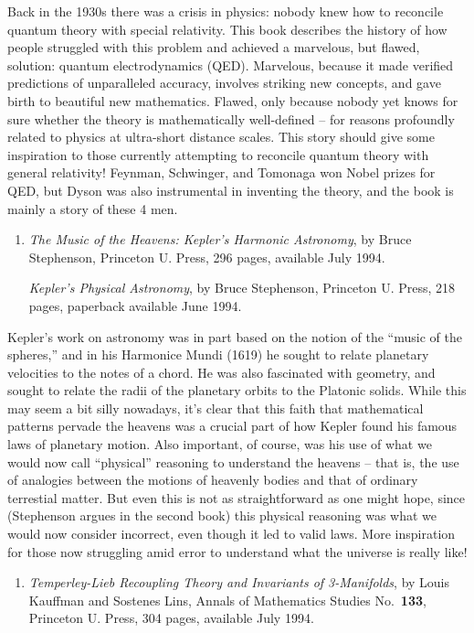 \documentclass{article}
\def\tightlist{}
\begin{document}
Back in the 1930s there was a crisis in physics: nobody knew how to
reconcile quantum theory with special relativity. This book describes
the history of how people struggled with this problem and achieved a
marvelous, but flawed, solution: quantum electrodynamics (QED).
Marvelous, because it made verified predictions of unparalleled
accuracy, involves striking new concepts, and gave birth to beautiful
new mathematics. Flawed, only because nobody yet knows for sure whether
the theory is mathematically well-defined -- for reasons profoundly
related to physics at ultra-short distance scales. This story should
give some inspiration to those currently attempting to reconcile quantum
theory with general relativity! Feynman, Schwinger, and Tomonaga won
Nobel prizes for QED, but Dyson was also instrumental in inventing the
theory, and the book is mainly a story of these 4 men.

\begin{enumerate}
\def\labelenumi{\arabic{enumi})}
\setcounter{enumi}{1}
\item
  \emph{The Music of the Heavens: Kepler's Harmonic Astronomy}, by Bruce
  Stephenson, Princeton U. Press, 296 pages, available July 1994.

  \emph{Kepler's Physical Astronomy}, by Bruce Stephenson, Princeton U.
  Press, 218 pages, paperback available June 1994.
\end{enumerate}

Kepler's work on astronomy was in part based on the notion of the
``music of the spheres,'' and in his Harmonice Mundi (1619) he sought to
relate planetary velocities to the notes of a chord. He was also
fascinated with geometry, and sought to relate the radii of the
planetary orbits to the Platonic solids. While this may seem a bit silly
nowadays, it's clear that this faith that mathematical patterns pervade
the heavens was a crucial part of how Kepler found his famous laws of
planetary motion. Also important, of course, was his use of what we
would now call ``physical'' reasoning to understand the heavens -- that
is, the use of analogies between the motions of heavenly bodies and that
of ordinary terrestial matter. But even this is not as straightforward
as one might hope, since (Stephenson argues in the second book) this
physical reasoning was what we would now consider incorrect, even though
it led to valid laws. More inspiration for those now struggling amid
error to understand what the universe is really like!

\begin{enumerate}
\def\labelenumi{\arabic{enumi})}
\setcounter{enumi}{2}
\tightlist
\item
  \emph{Temperley-Lieb Recoupling Theory and Invariants of 3-Manifolds},
  by Louis Kauffman and Sostenes Lins, Annals of Mathematics Studies
  No.~\textbf{133}, Princeton U. Press, 304 pages, available July 1994.
\end{enumerate}
\end{document}
